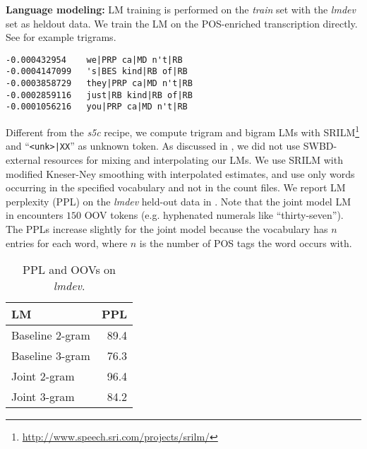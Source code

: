 \documentclass[11pt,letterpaper]{article}
\begin{document}
\textbf{Language modeling:} LM training is performed on the \emph{train} set with the \emph{lmdev} set as heldout data. We train the LM on the POS-enriched transcription directly. See  for example trigrams.
\begin{center}
\vspace{5pt}
\begin{lstlisting}[basicstyle=\scriptsize\ttfamily,columns=fixed,fontadjust=true,basewidth=0.5em,frame=tb]
-0.000432954    we|PRP ca|MD n't|RB
-0.0004147099   's|BES kind|RB of|RB
-0.0003858729   they|PRP ca|MD n't|RB
-0.0002859116   just|RB kind|RB of|RB
-0.0001056216   you|PRP ca|MD n't|RB
\end{lstlisting}
\label{fig:trigrams}
\vspace{5pt}
\end{center}
Different from the \emph{s5c} recipe, we compute trigram and bigram LMs with SRILM\footnote{\url{http://www.speech.sri.com/projects/srilm/}} \citep{Stolcke:2002} and ``\texttt{<unk>|XX}'' as unknown token. As discussed in , we did not use SWBD-external resources for mixing and interpolating our LMs. We use SRILM with modified Kneser-Ney smoothing \citep{ChenGoodman:1999} with interpolated estimates, and use only words occurring in the specified vocabulary and not in the count files. We report LM perplexity (PPL) on the \emph{lmdev} held-out data in .
Note that the joint model LM in  encounters $150$ OOV tokens (e.g. hyphenated numerals like ``thirty-seven''). The PPLs increase slightly for the joint model because the vocabulary has $n$ entries for each word, where $n$ is the number of POS tags the word occurs with.

\begin{table}[h]
\centering
            \begin{tabular}{@{}lr@{}}
                \toprule
                LM & \multicolumn{1}{l}{PPL} \\ \midrule
                Baseline 2-gram & 89.4  \\
                Baseline 3-gram & 76.3  \\
                Joint 2-gram & 96.4  \\
                Joint 3-gram & 84.2  \\
                \bottomrule
            \end{tabular}%
\caption{PPL and OOVs on \emph{lmdev}.}
\label{tab:ppl}
  
\end{table}
\end{document}

